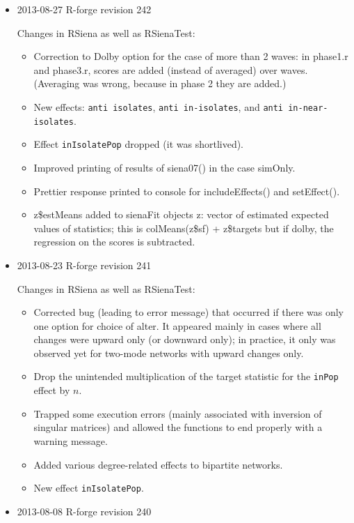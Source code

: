 \documentclass[a4paper,fleqn,11pt]{article}
\newcommand{\+}{\, + \,}
\newcommand{\sfn}[1]{\textsf{#1}}
\begin{document}
\begin{small}
\begin{itemize}
\item 2013-08-27 R-forge revision 242

Changes in RSiena as well as RSienaTest:
  \begin{itemize}
  \item Correction to Dolby option for the case of more than 2 waves:
     in \sfn{phase1.r} and \sfn{phase3.r}, scores are added
     (instead of averaged) over waves.
     (Averaging was wrong, because in phase 2 they are added.)
  \item New effects: \texttt{anti isolates}, \texttt{anti in-isolates},
   and \texttt{anti in-near-isolates}.
  \item Effect \texttt{inIsolatePop} dropped (it was shortlived).
  \item Improved printing of results of \sfn{siena07()} in the case
    \sfn{simOnly}.
  \item Prettier response printed to console for \sfn{includeEffects()} and
        \sfn{setEffect()}.
  \item \sfn{z\$estMeans} added to sienaFit objects \sfn{z}:
     vector of estimated expected values of statistics;
	 this is \sfn{colMeans(z\$sf) + z\$targets}  but if dolby,
	 the regression on the scores is subtracted.
  \end{itemize}


\item 2013-08-23 R-forge revision 241

Changes in RSiena as well as RSienaTest:
  \begin{itemize}
  \item Corrected bug (leading to error message)
     that occurred if there was only one option
     for choice of alter. It appeared mainly in cases where all changes
     were upward only (or downward only); in practice, it only was observed
     yet for two-mode networks with upward changes only.
  \item  Drop the unintended multiplication of the target statistic
     for the \texttt{inPop} effect by $n$.
  \item Trapped some execution errors (mainly associated with inversion of
    singular matrices) and allowed the functions to end properly
    with a warning message.
  \item Added various degree-related effects to bipartite networks.
  \item New effect \texttt{inIsolatePop}.
  \end{itemize}

\item 2013-08-08 R-forge revision 240


\end{itemize}
\end{small}
\end{document}
